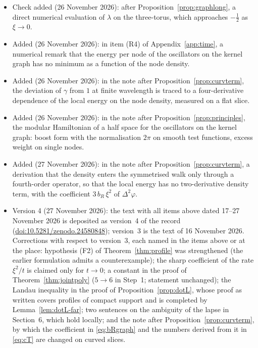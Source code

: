 \documentclass[11pt,a4paper]{article}
\theoremstyle{stmt}
\theoremstyle{defn}
\theoremstyle{rmk}
\numberwithin{equation}{section}
\begin{document}
\begin{itemize}
\item Check added (26 November 2026): after Proposition~\ref{prop:graphlong}, a direct numerical evaluation of $\lambda$ on the three-torus, which approaches $-\tfrac12$ as $\xi\to0$.
\item Added (26 November 2026): in item (R4) of Appendix~\ref{app:time}, a numerical remark that the energy per node of the oscillators on the kernel graph has no minimum as a function of the node density.
\item Added (26 November 2026): in the note after Proposition~\ref{prop:curvterm}, the deviation of $\gamma$ from $1$ at finite wavelength is traced to a four-derivative dependence of the local energy on the node density, measured on a flat slice.
\item Added (26 November 2026): in the note after Proposition~\ref{prop:principles}, the modular Hamiltonian of a half space for the oscillators on the kernel graph: boost form with the normalisation $2\pi$ on smooth test functions, excess weight on single nodes.
\item Added (27 November 2026): in the note after Proposition~\ref{prop:curvterm}, a derivation that the density enters the symmetrised walk only through a fourth-order operator, so that the local energy has no two-derivative density term, with the coefficient $3\,b_R\,\xi^2$ of $\Delta^2\varphi$.
\item Version 4 (27 November 2026): the text with all items above dated 17--27 November 2026 is deposited as version~4 of the record (\href{https://doi.org/10.5281/zenodo.24580848}{doi:10.5281/zenodo.24580848}); version~3 is the text of 16 November 2026. Corrections with respect to version~3, each named in the items above or at the place: hypothesis (F2) of Theorem~\ref{thm:profile} was strengthened (the earlier formulation admits a counterexample); the sharp coefficient of the rate $\xi^2/t$ is claimed only for $t\to0$; a constant in the proof of Theorem~\ref{thm:jointpoly} ($5\to6$ in Step~1; statement unchanged); the Landau inequality in the proof of Proposition~\ref{prop:dotL}, whose proof as written covers profiles of compact support and is completed by Lemma~\ref{lem:dotL-far}; two sentences on the ambiguity of the lapse in Section~6, which hold locally; and the note after Proposition~\ref{prop:curvterm}, by which the coefficient in \eqref{eq:bRgraph} and the numbers derived from it in \eqref{eq:cT} are changed on curved slices.

\end{itemize}
\end{document}
